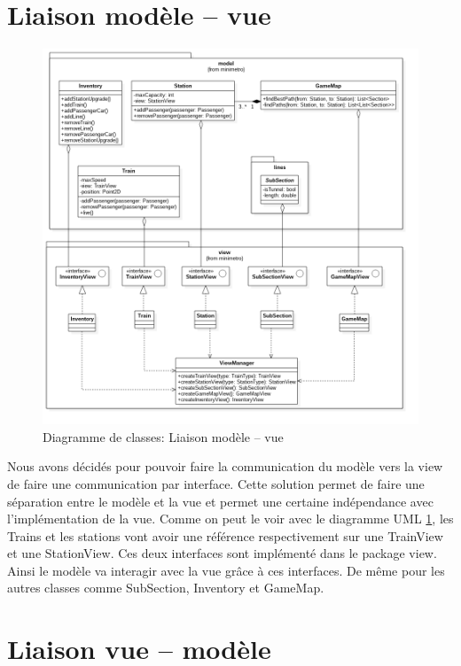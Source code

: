 \documentclass[report, backcover, french, nodocumentinfo]{upmethodology-document}
\begin{document}
		\section{Liaison modèle -- vue}
			\begin{figure}[h!]
				\centering
				\includegraphics[width=\textwidth]{figures/ModelViewLinkClassDiagram}
				\caption{Diagramme de classes: Liaison modèle -- vue}
				\label{fig:ModelViewLinkClassDiagram}
			\end{figure}
				Nous avons décidés pour pouvoir faire la communication du modèle vers la view de faire une communication par interface. Cette solution permet de faire une séparation entre le modèle et la vue et permet une certaine indépendance avec l'implémentation de la vue.
				Comme on peut le voir avec le diagramme UML \ref{fig:ModelViewLinkClassDiagram}, les Trains et les stations vont avoir une référence respectivement sur une TrainView et une StationView. Ces deux interfaces sont implémenté dans le package view. Ainsi le modèle va interagir avec la vue grâce à ces interfaces. De même pour les autres classes comme SubSection, Inventory et GameMap.
		\section{Liaison vue -- modèle}
\end{document}
